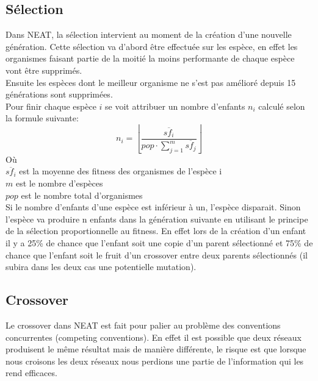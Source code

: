 \documentclass{article}
\begin{document}
\subsection{Sélection}

Dans NEAT, la sélection intervient au moment de la création d'une nouvelle génération. Cette sélection va d'abord être effectuée sur les espèce, en effet les organismes faisant partie de la moitié la moins performante de chaque espèce vont être supprimés.\\
Ensuite les espèces dont le meilleur organisme ne s'est pas amélioré depuis 15 générations sont supprimées.\\
Pour finir chaque espèce $i$ se voit attribuer un nombre d'enfants $n_i$ calculé selon la formule suivante:
\begin{equation}
	n_i = \left\lfloor\frac{\overline{sf_i}}{pop \cdot \sum^m_{j=1} \overline{sf_j}}\right\rfloor
\end{equation}
Où\\
$\overline{sf_i}$ est la moyenne des fitness des organismes de l'espèce i\\
$m$ est le nombre d'espèces\\
$pop$ est le nombre total d'organismes\\

Si le nombre d'enfants d'une espèce est inférieur à un, l'espèce disparait. Sinon l'espèce va produire n enfants dans la génération suivante en utilisant le principe de la sélection proportionnelle au fitness. En effet lors de la création d'un enfant il y a 25\% de chance que l'enfant soit une copie d'un parent sélectionné et 75\% de chance que l'enfant soit le fruit d'un crossover entre deux parents sélectionnés (il subira dans les deux cas une potentielle mutation).

\subsection{Crossover}

Le crossover dans NEAT est fait pour palier au problème des conventions concurrentes (competing conventions). En effet il est possible que deux réseaux produisent le même résultat mais de manière différente, le risque est que lorsque nous croisons les deux réseaux nous perdions une partie de l'information qui les rend efficaces.
\end{document}
